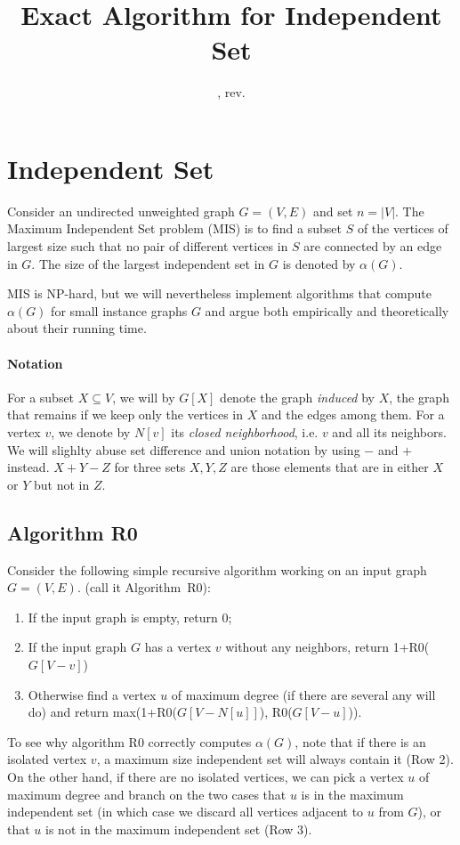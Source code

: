 \documentclass{tufte-handout}
\title{\sf Exact Algorithm for Independent Set}
\date{\GITAuthorDate, rev. \GITAbrHash}
\author{}
\begin{document}
\maketitle

\section{Independent Set}
Consider an undirected unweighted graph $G=(V,E)$ and set $n=|V|$.
The Maximum Independent Set problem (MIS) is to find a subset $S$ of the
vertices of largest size such that no pair of different vertices in $S$ are connected by an edge in $G$. The size of the largest independent set in $G$ is denoted by $\alpha(G)$.

MIS is NP-hard, but we will nevertheless implement algorithms that compute $\alpha(G)$ for small instance graphs $G$ and argue both empirically and theoretically about their running time.

\paragraph{Notation}
For a subset $X\subseteq V$, we will by $G[X]$ denote the graph \emph{induced} by $X$, the graph that remains if we keep only the vertices in $X$ and the edges among them. For a vertex $v$, we denote by $N[v]$ its \emph{closed neighborhood}, i.e. $v$ and all its neighbors. We will slighlty abuse set difference and union notation by using $-$ and $+$ instead. $X+Y-Z$ for three sets $X,Y,Z$ are those elements that are in either $X$ or $Y$ but not in $Z$. 

\subsection{ Algorithm R0}

Consider the following simple recursive algorithm working on an input graph $G=(V,E)$. (call it
Algorithm~R0): 
\begin{enumerate}
\item
If the input graph is empty, return 0;
\item
If the input graph $G$ has a vertex $v$ without any neighbors, return 1+R0($G[V-v]$)
\item
Otherwise find a vertex $u$ of maximum degree (if there are several any will do) and return max(1+R0($G[V-N[u]]$), R0($G[V-u]$)).
\end{enumerate}

To see why algorithm R0 correctly computes $\alpha(G)$, note that if there is an isolated vertex $v$, a maximum size independent set will always contain it (Row 2). On the other hand, if there are no isolated vertices, we can pick a vertex $u$ of maximum degree and branch on the two cases that $u$ is in the maximum independent set (in which case we discard all vertices adjacent to $u$ from $G$), or that $u$ is not in the maximum independent set (Row 3).
\end{document}
